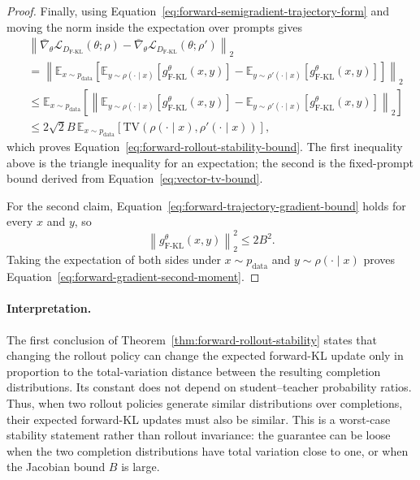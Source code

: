 \documentclass{article} %
\theoremstyle{plain}
\theoremstyle{definition}
\theoremstyle{remark}
\begin{document}
\begin{proof}
Finally, using Equation~\ref{eq:forward-semigradient-trajectory-form} and
moving the norm inside the expectation over prompts gives
\begin{align}
    &\left\lVert
        \bar\nabla_\theta
        \mathcal L_{D_{\mathrm{F\text{-}KL}}}(\theta;\rho)
        -
        \bar\nabla_\theta
        \mathcal L_{D_{\mathrm{F\text{-}KL}}}(\theta;\rho')
    \right\rVert_2\\
    &=
    \left\lVert
        \mathbb E_{x\sim p_{\mathrm{data}}}
        \left[
            \mathbb E_{y\sim\rho(\cdot\mid x)}
            \left[g_{\mathrm{F\text{-}KL}}^\theta(x,y)\right]
            -
            \mathbb E_{y\sim\rho'(\cdot\mid x)}
            \left[g_{\mathrm{F\text{-}KL}}^\theta(x,y)\right]
        \right]
    \right\rVert_2\\
    &\le
    \mathbb E_{x\sim p_{\mathrm{data}}}
    \left[
        \left\lVert
            \mathbb E_{y\sim\rho(\cdot\mid x)}
            \left[g_{\mathrm{F\text{-}KL}}^\theta(x,y)\right]
            -
            \mathbb E_{y\sim\rho'(\cdot\mid x)}
            \left[g_{\mathrm{F\text{-}KL}}^\theta(x,y)\right]
        \right\rVert_2
    \right]\\
    &\le
    2\sqrt2B\,
    \mathbb E_{x\sim p_{\mathrm{data}}}
    \left[
        \mathrm{TV}\!\left(
            \rho(\cdot\mid x),
            \rho'(\cdot\mid x)
        \right)
    \right],
\end{align}
which proves Equation~\ref{eq:forward-rollout-stability-bound}.  The first
inequality above is the triangle inequality for an expectation; the second is
the fixed-prompt bound derived from Equation~\ref{eq:vector-tv-bound}.

For the second claim, Equation~\ref{eq:forward-trajectory-gradient-bound}
holds for every $x$ and $y$, so
\begin{equation}
    \left\lVert
        g_{\mathrm{F\text{-}KL}}^\theta(x,y)
    \right\rVert_2^2
    \le 2B^2.
\end{equation}
Taking the expectation of both sides under
$x\sim p_{\mathrm{data}}$ and $y\sim\rho(\cdot\mid x)$ proves
Equation~\ref{eq:forward-gradient-second-moment}.
\end{proof}

\paragraph{Interpretation.}
The first conclusion of Theorem~\ref{thm:forward-rollout-stability} states that
changing the rollout policy can change the expected forward-KL update only in
proportion to the total-variation distance between the resulting completion
distributions.  Its constant does not depend on student--teacher probability
ratios.  Thus, when two rollout policies generate similar distributions over
completions, their expected forward-KL updates must also be similar.  This is a
worst-case stability statement rather than rollout invariance: the guarantee
can be loose when the two completion distributions have total variation close
to one, or when the Jacobian bound $B$ is large.
\end{document}
